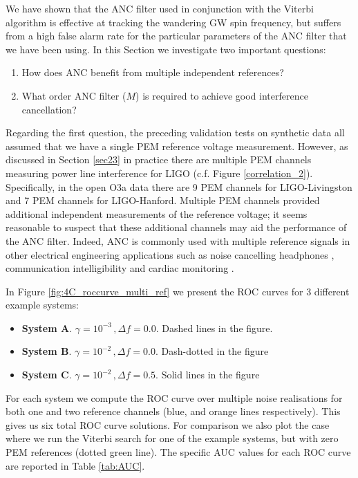 \documentclass[pra,superscriptaddress,reprint,amsmath,amssymb,nofootinbib]{revtex4-2}
\begin{document}
We have shown that the ANC filter used in conjunction with the Viterbi algorithm is effective at tracking the wandering GW spin frequency, but suffers from a high false alarm rate for the particular parameters of the ANC filter that we have been using. In this Section we investigate two important questions:
\begin{enumerate}
	\item How does ANC benefit from multiple independent references?
	\item What order ANC filter ($M$) is required to achieve good interference cancellation? 
\end{enumerate} 

Regarding the first question, the preceding validation tests on synthetic data all assumed that we have a single PEM reference voltage measurement. However, as discussed in Section \ref{sec23} in practice there are multiple PEM channels measuring power line interference for LIGO (c.f. Figure \ref{correlation_2}). Specifically, in the open O3a data there are 9 PEM channels for LIGO-Livingston and 7 PEM channels for LIGO-Hanford. Multiple PEM channels provided additional independent measurements of the reference voltage; it seems reasonable to suspect that these additional channels may aid the performance of the ANC filter. Indeed, ANC is commonly used with multiple reference signals in other electrical engineering applications such as noise cancelling headphones \citep{10.1121/1.5109394}, communication intelligibility \citep{KUO1996669,doi:10.1177/1084713812456906} and cardiac monitoring \citep{7755741}. \newline 

In Figure \ref{fig:4C_roccurve_multi_ref} we present the ROC curves for 3 different example systems:
\begin{itemize}
	\item \textbf{System A}. $\gamma = 10^{-3} \, , \Delta f = 0.0$. Dashed lines in the figure.
	\item \textbf{System B}. $\gamma = 10^{-2} \, , \Delta f = 0.0$. Dash-dotted in the figure
	\item \textbf{System C}. $\gamma = 10^{-2} \, , \Delta f = 0.5$. Solid lines in the figure
\end{itemize}
For each system we compute the ROC curve over multiple noise realisations for both one and two reference channels (blue, and orange lines respectively). This gives us six total ROC curve solutions. For comparison we also plot the case where we run the Viterbi search for one of the example systems, but with zero PEM references (dotted green line). The specific AUC values for each ROC curve are reported in Table \ref{tab:AUC}. \newline 
\end{document}
